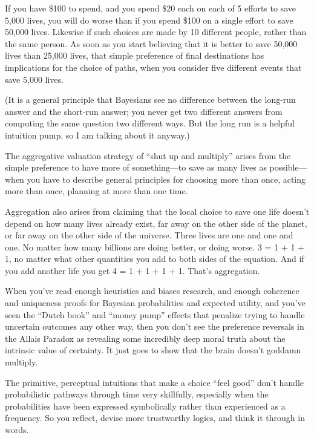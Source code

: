 {
 If you have \$100 to spend, and you spend \$20 each on each of 5
efforts to save 5,000 lives, you will do worse than if you spend \$100
on a single effort to save 50,000 lives. Likewise if such choices are
made by 10 different people, rather than the same person. As soon as
you start believing that it is better to save 50,000 lives than 25,000
lives, that simple preference of final destinations has implications
for the choice of paths, when you consider five different events that
save 5,000 lives.}

{
 (It is a general principle that Bayesians see no difference
between the long-run answer and the short-run answer; you never get two
different answers from computing the same question two different ways.
But the long run is a helpful intuition pump, so I am talking about it
anyway.)}

{
 The aggregative valuation strategy of ``shut up
and multiply'' arises from the simple preference to
have more of something---to save as many lives as possible---when you
have to describe general principles for choosing more than once, acting
more than once, planning at more than one time.}

{
 Aggregation also arises from claiming that the local choice to
save one life doesn't depend on how many lives already
exist, far away on the other side of the planet, or far away on the
other side of the universe. Three lives are one and one and one. No
matter how many billions are doing better, or doing worse. 3 = 1 + 1 +
1, no matter what other quantities you add to both sides of the
equation. And if you add another life you get 4 = 1 + 1 + 1 + 1.
That's aggregation.}

{
 When you've read enough heuristics and biases
research, and enough coherence and uniqueness proofs for Bayesian
probabilities and expected utility, and you've seen the
``Dutch book'' and
``money pump'' effects that penalize
trying to handle uncertain outcomes any other way, then you
don't see the preference reversals in the Allais
Paradox as revealing some incredibly deep moral truth about the
intrinsic value of certainty. It just goes to show that the brain
doesn't goddamn multiply.}

{
 The primitive, perceptual intuitions that make a choice
``feel good'' don't
handle probabilistic pathways through time very skillfully, especially
when the probabilities have been expressed symbolically rather than
experienced as a frequency. So you reflect, devise more trustworthy
logics, and think it through in words.}

